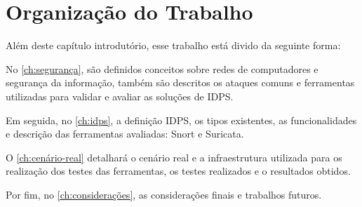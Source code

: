 \section{Organização do Trabalho} \label{sec:organização-do-trabalho}

Além deste capítulo introdutório, esse trabalho está divido da seguinte forma:

No \autoref{ch:segurança}, são definidos conceitos sobre redes de computadores e segurança da informação, também são descritos os ataques comuns e ferramentas utilizadas para validar e avaliar as soluções de IDPS.

Em seguida, no \autoref{ch:idps}, a definição IDPS, os tipos existentes, as funcionalidades e descrição das ferramentas avaliadas: Snort e Suricata.

O \autoref{ch:cenário-real} detalhará o cenário real e a infraestrutura utilizada para os realização dos testes das ferramentas, os testes realizados e o resultados obtidos.

Por fim, no \autoref{ch:considerações}, as considerações finais e trabalhos futuros.
